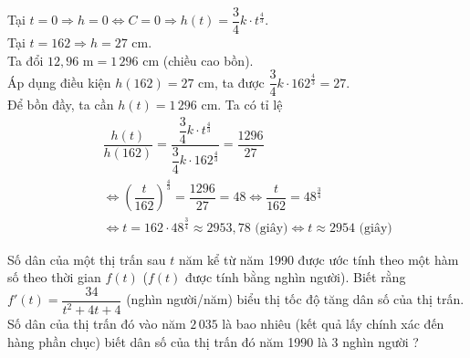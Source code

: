 \begin{bt}
{		Tại $t=0 \Rightarrow h=0  \Leftrightarrow C=0\Rightarrow h(t)=\dfrac{3}{4}k\cdot t^{\frac{4}{3}}$.\\
		Tại $t=162 \Rightarrow  h=27$ cm.\\
		Ta đổi $12{,}96$ m$=  1\,296$ cm (chiều cao bồn).\\
		Áp dụng  điều kiện $h(162)=27$ cm, ta được $\dfrac{3}{4}k\cdot 162^{\frac{4}{3}}=27$.\\
		Để bồn đầy, ta cần $h(t)=1\,296$ cm. Ta có tỉ lệ 
		\allowdisplaybreaks 
		\begin{eqnarray*}
			 &&\dfrac{h(t)}{h(162)}=\dfrac{\dfrac{3}{4}k\cdot t^{\frac{4}{3}}}{\dfrac{3}{4}k\cdot 162^{\frac{4}{3}}}=\dfrac{1296}{27} \\
			&&\Leftrightarrow \left(\dfrac{t}{162}\right)^{\frac{4}{3}} = \dfrac{1296}{27}=48\Leftrightarrow \dfrac{t}{162} = 48^{\frac{3}{4}}  \\
			&&\Leftrightarrow t =162 \cdot 48^{\frac{3}{4}} \approx 2953{,}78  \text{ (giây)}\Leftrightarrow t \approx 2954 \text{ (giây)}
		\end{eqnarray*}
	} 
\end{bt}

\begin{bt}%
	Số dân của một thị trấn sau $t$ năm kể từ năm 1990 được ước tính theo một hàm số theo thời gian $f(t)$ ($f(t)$ được tính bằng nghìn người). Biết rằng $f'(t)=\dfrac{34}{t^2+4t+4}$  (nghìn người/năm) biểu thị tốc độ tăng dân số của thị trấn. Số dân của thị trấn đó vào năm $2\,035$ là bao nhiêu (kết quả lấy chính xác đến hàng phần chục) biết dân số của thị trấn đó năm 1990 là $3$ nghìn người ?
\end{bt}


